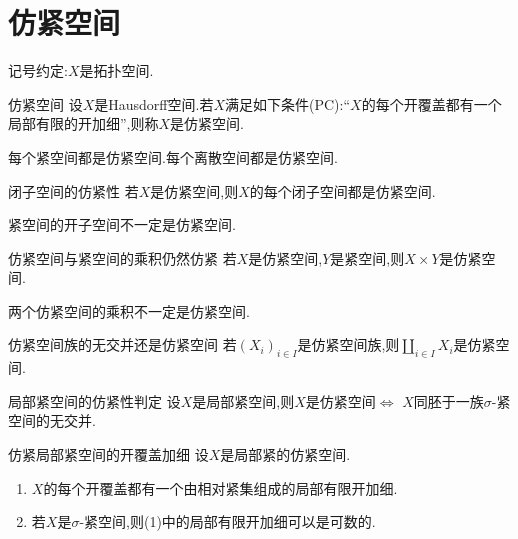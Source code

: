\section{仿紧空间}

记号约定:$X$是拓扑空间.

\begin{definition}{仿紧空间}{}
	设$X$是Hausdorff空间.若$X$满足如下条件($\mathrm{PC}$):``$X$的每个开覆盖都有一个局部有限的开加细'',则称$X$是仿紧空间.
\end{definition}

\begin{remark}{}{}
	每个紧空间都是仿紧空间.每个离散空间都是仿紧空间.
\end{remark}

\begin{proposition}{闭子空间的仿紧性}{}
	若$X$是仿紧空间,则$X$的每个闭子空间都是仿紧空间.
\end{proposition}

\begin{remark}{}{}
	紧空间的开子空间不一定是仿紧空间.
\end{remark}

\begin{proposition}{仿紧空间与紧空间的乘积仍然仿紧}{}
	若$X$是仿紧空间,$Y$是紧空间,则$X\times Y$是仿紧空间.
\end{proposition}

\begin{remark}{}{}
	两个仿紧空间的乘积不一定是仿紧空间.
\end{remark}

\begin{proposition}{仿紧空间族的无交并还是仿紧空间}{}
	若$\left(X_{i}\right)_{i\in I}$是仿紧空间族,则$\coprod\limits_{i\in I}X_{i}$是仿紧空间.
\end{proposition}

\begin{proposition}{局部紧空间的仿紧性判定}{}
	设$X$是局部紧空间,则$X$是仿紧空间$\iff$ $X$同胚于一族$\sigma$-紧空间的无交并.
\end{proposition}

\begin{corollary}{仿紧局部紧空间的开覆盖加细}{}
	设$X$是局部紧的仿紧空间.
	\begin{enumerate}
		\item $X$的每个开覆盖都有一个由相对紧集组成的局部有限开加细.
		\item 若$X$是$\sigma$-紧空间,则(1)中的局部有限开加细可以是可数的.
	\end{enumerate}
\end{corollary}

